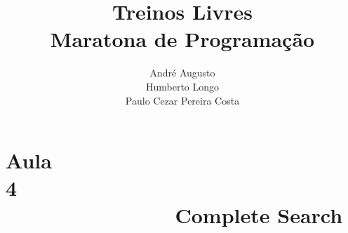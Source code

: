 \documentclass{beamer}
\title[Treinos Livres]{Treinos Livres\\ Maratona de Programação}
\author[{\tiny André, Humberto, Paulo Cezar}]{André Augusto\\ Humberto Longo\\ Paulo Cezar Pereira Costa }
\institute[]{Instituto de Informática\\
           Universidade Federal de Goiás}
\begin{document}
\beamertemplatenavigationsymbolsempty
\maketitle


%
%
%

%

\section{Aula 4\ \ \ \ \ \ \ \ \ \ \ \ \ \ \ \ \ \ \ \ \ \ \ \ \ \ \ \ \ \ \ \ \ \ \ \ \ \ \ \ \ \ \ \ \  Complete Search}

\end{document}
